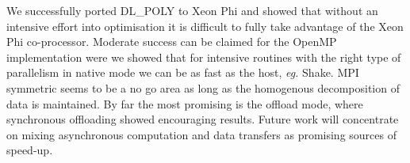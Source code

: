 \par{We successfully ported DL\_POLY to Xeon Phi and showed that without an intensive effort into optimisation it is 
difficult to fully take advantage of the Xeon Phi co-processor. Moderate success can be claimed for the OpenMP implementation were
we showed that for intensive routines with the right type of parallelism in native mode we can be as fast as the host, 
\emph{eg.} Shake. MPI symmetric seems to be a no go area as long as the homogenous decomposition of data is maintained.
By far the most promising is the offload mode, where synchronous offloading showed encouraging results. Future work will 
concentrate on mixing asynchronous computation and data transfers as promising sources of speed-up.}
